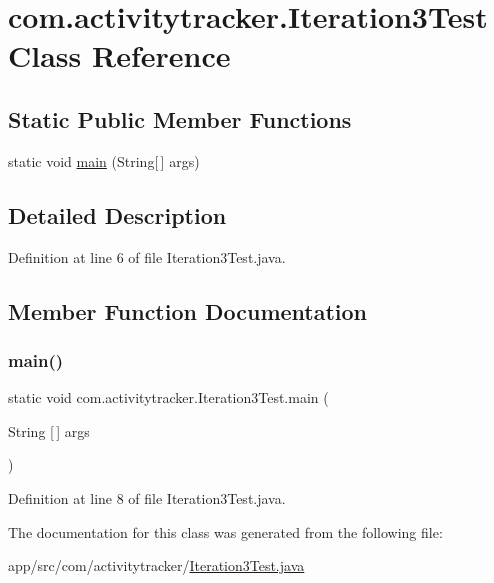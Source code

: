 \hypertarget{classcom_1_1activitytracker_1_1_iteration3_test}{}\section{com.\+activitytracker.\+Iteration3\+Test Class Reference}
\label{classcom_1_1activitytracker_1_1_iteration3_test}
\subsection*{Static Public Member Functions}
\begin{DoxyCompactItemize}
\item 
static void \mbox{\hyperlink{classcom_1_1activitytracker_1_1_iteration3_test_a54f41d79b383667b8f79258dbfd7771c}{main}} (String\mbox{[}$\,$\mbox{]} args)
\end{DoxyCompactItemize}


\subsection{Detailed Description}


Definition at line 6 of file Iteration3\+Test.\+java.



\subsection{Member Function Documentation}
\mbox{\label{classcom_1_1activitytracker_1_1_iteration3_test_a54f41d79b383667b8f79258dbfd7771c}} 
\subsubsection{\texorpdfstring{main()}{main()}}
{\footnotesize\ttfamily static void com.\+activitytracker.\+Iteration3\+Test.\+main (\begin{DoxyParamCaption}\item[{String \mbox{[}$\,$\mbox{]}}]{args }\end{DoxyParamCaption})\hspace{0.3cm}{\ttfamily [static]}}



Definition at line 8 of file Iteration3\+Test.\+java.



The documentation for this class was generated from the following file\+:\begin{DoxyCompactItemize}
\item 
app/src/com/activitytracker/\mbox{\hyperlink{_iteration3_test_8java}{Iteration3\+Test.\+java}}\end{DoxyCompactItemize}

